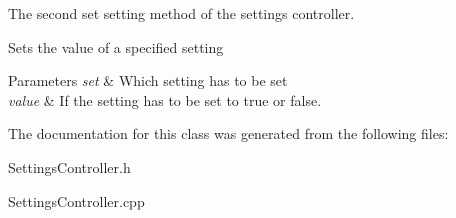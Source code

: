 The second set setting method of the settings controller. 

Sets the value of a specified setting 
\begin{DoxyParams}{Parameters}
{\em set} & Which setting has to be set \\
\hline
{\em value} & If the setting has to be set to true or false. \\
\hline
\end{DoxyParams}


The documentation for this class was generated from the following files\+:\begin{DoxyCompactItemize}
\item 
Settings\+Controller.\+h\item 
Settings\+Controller.\+cpp\end{DoxyCompactItemize}
